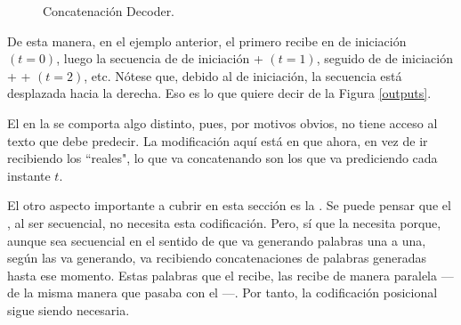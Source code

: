 \begin{figure}[H]
    \centering
    \caption{Concatenación Decoder.}
    \label{ext_teacher_forcing}
\end{figure}

De esta manera, en el ejemplo anterior, el  primero recibe en  de iniciación $(t=0)$, luego la secuencia de  de iniciación + \ul{} $(t=1)$, seguido de  de iniciación + \ul{} + \ul{} $(t=2)$, etc. Nótese que, debido al  de iniciación, la secuencia está desplazada hacia la derecha. Eso es lo que quiere decir  de la Figura \ref{outputs}.

El  en la  se comporta algo distinto, pues, por motivos obvios, no tiene acceso al texto  que debe predecir. La modificación aquí está en que ahora, en vez de ir recibiendo los  ``reales", lo que va concatenando son los  que va prediciendo cada instante $t$.

El otro aspecto importante a cubrir en esta sección es la . Se puede pensar que el , al ser secuencial, no necesita esta codificación. Pero, sí que la necesita porque, aunque sea secuencial en el sentido de que va generando palabras una a una, según las va generando, va recibiendo concatenaciones de palabras generadas hasta ese momento. Estas palabras que el  recibe, las recibe de manera paralela ---de la misma manera que pasaba con el ---. Por tanto, la codificación posicional sigue siendo necesaria.

